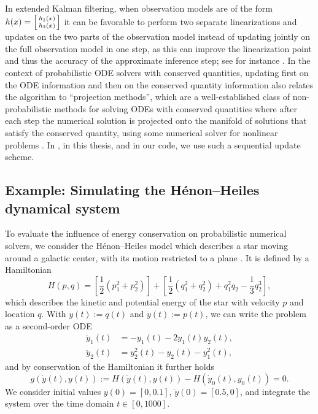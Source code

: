 \documentclass{mimosis}
\begin{document}
\begin{remark}
In extended Kalman filtering,
when observation models are of the form
\(\obsh(\st) = \smqty[\obsh_1(\st) \\ \obsh_2(\st)]\)
it can be favorable to perform two separate linearizations and updates on the two parts of the observation model instead of updating jointly on the full observation model in one step,
as this can improve the linearization point and thus the accuracy of the approximate inference step;
see for instance
\textcite{8861457,partitionedupdateKF,RAITOHARJU2017289}.
In the context of probabilistic ODE solvers with conserved quantities, updating first on the ODE information and then on the conserved quantity information also relates the algorithm to ``projection methods'', which are a well-established class of non-probabilistic methods for solving ODEs with conserved quantities where after each step the numerical solution is projected onto the manifold of solutions that satisfy the conserved quantity, using some numerical solver for nonlinear problems
\parencite[Section IV.4]{hairer2006geometric}.
In \pickandmix{}, in this thesis, and in our code, we use such a sequential update scheme.
\end{remark}
\subsection{Example: Simulating the Hénon--Heiles dynamical system}
\label{sec:orgf24724a}
To evaluate the influence of energy conservation on probabilistic numerical solvers, we consider the Hénon--Heiles model which describes a star moving around a galactic center, with its motion restricted to a plane
\parencite{henonheiles}.
It is defined by a Hamiltonian
\begin{equation}
  H(p, q) =
  \left[ \frac{1}{2} \left( p_1^2 + p_2^2 \right) \right] +
  \left[ \frac{1}{2} \left( q_1^2 + q_2^2 \right) + q_1^2 q_2 - \frac{1}{3} q_2^3 \right],
\end{equation}
which describes the kinetic and potential energy of the star with
velocity \(p\) and location \(q\).
With \(y(t) := q(t)\) and \(\dot{y}(t) := p(t)\), we can write the problem as a second-order ODE
\begin{subequations}
\begin{align}
  \ddot{y}_1(t) &= -y_1(t) - 2 y_1(t) y_2(t), \\
  \ddot{y}_2(t) &= y_2^2(t) - y_2(t) - y_1^2(t),
\end{align}
\end{subequations}
and by conservation of the Hamiltonian it further holds \parencite{hairer2006geometric}
\begin{equation}
  g(\dot{y}(t), y(t)) := H(\dot{y}(t), y(t)) - H(\dot{y}_0(t), y_0(t)) = 0.
\end{equation}
We consider initial values \(y(0) = [0, 0.1]\), \(\dot{y}(0) = [0.5, 0]\), and integrate the system over the time domain \(t \in [0, 1000]\).
\end{document}
